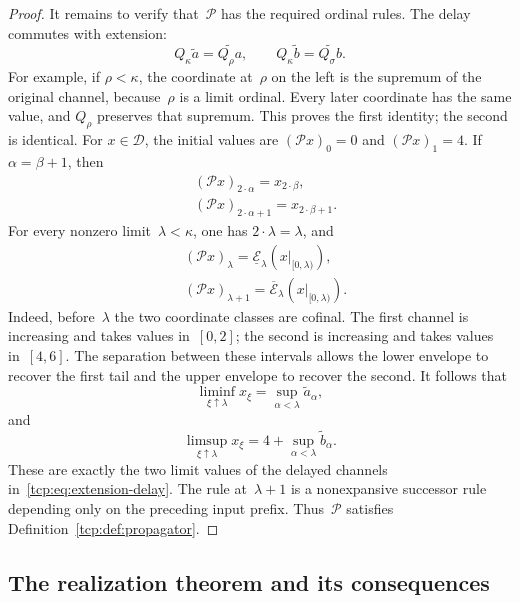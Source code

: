 \documentclass[preprint,12pt,nopreprintline]{elsarticle}
\theoremstyle{definition}
\theoremstyle{remark}
\numberwithin{equation}{section}
\begin{document}
\begin{proof}
It remains to verify that~$\mathscr P$ has the required ordinal rules. The delay commutes with extension:
\begin{equation}
 Q_\kappa\widetilde a=\widetilde{Q_\rho a},\qquad
 Q_\kappa\widetilde b=\widetilde{Q_\sigma b}.
 \label{tcp:eq:extension-delay}
\end{equation}
For example, if $\rho<\kappa$, the coordinate at~$\rho$ on the left is the supremum of the original channel, because~$\rho$ is
a limit ordinal. Every later coordinate has the same value, and $Q_\rho$ preserves that supremum. This proves the first identity;
the second is identical. For $x\in\mathcal D$, the initial values are $(\mathscr Px)_0=0$ and $(\mathscr Px)_1=4$. If $\alpha=\beta+1$, then
\begin{equation}
\begin{split}
 &(\mathscr Px)_{2\cdot\alpha}=x_{2\cdot\beta},\\[1.5mm]
 &(\mathscr Px)_{2\cdot\alpha+1}=x_{2\cdot\beta+1}.
\end{split}
 \label{tcp:eq:encoded-successors}
\end{equation}
For every nonzero limit~$\lambda<\kappa$, one has
$2\cdot\lambda=\lambda$, and
\begin{equation}
 \begin{aligned}
 &(\mathscr Px)_\lambda =\underline{\mathcal E}_\lambda(x|_{[0,\lambda)}),\\[1.5mm]
 &(\mathscr Px)_{\lambda+1}=\overline{\mathcal E}_\lambda(x|_{[0,\lambda)}).
 \end{aligned}
 \label{tcp:eq:encoded-limits}
\end{equation}
Indeed, before~$\lambda$ the two coordinate classes are cofinal. The first channel is increasing and takes values in~$[0,2]$;
the second is increasing and takes values in~$[4,6]$. The separation between these intervals allows the lower envelope to recover the first tail and the upper envelope to recover the second. It follows that
\[
 \liminf_{\xi\uparrow\lambda}x_\xi=\sup_{\alpha<\lambda}\widetilde a_\alpha,
\]
and
\[
 \limsup_{\xi\uparrow\lambda}x_\xi=4+\sup_{\alpha<\lambda}\widetilde b_\alpha.
\]
These are exactly the two limit values of the delayed channels in~\eqref{tcp:eq:extension-delay}. The rule at~$\lambda+1$ is a
nonexpansive successor rule depending only on the preceding input prefix. Thus~$\mathscr P$ satisfies Definition~\ref{tcp:def:propagator}.
\end{proof}


\subsection{The realization theorem and its consequences}
\end{document}
